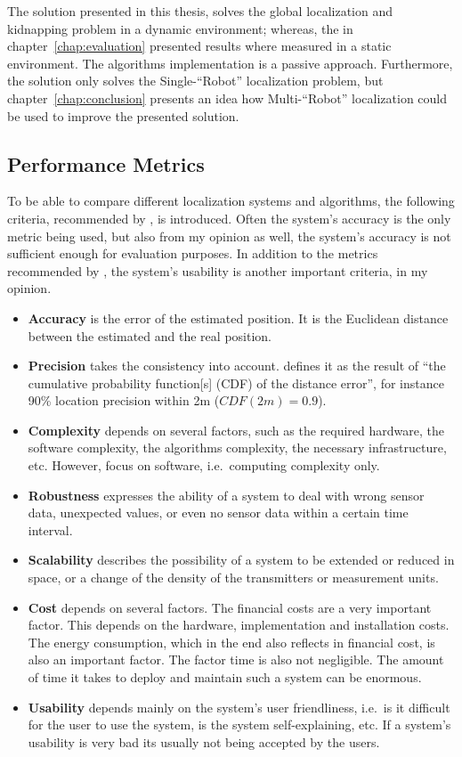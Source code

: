 \noindent The solution presented in this thesis, solves the global localization and kidnapping problem in a dynamic environment; whereas, the in chapter~\ref{chap:evaluation} presented results where measured in a static environment. The algorithms implementation is a passive approach. Furthermore, the solution only solves the Single-``Robot'' localization problem, but chapter~\ref{chap:conclusion} presents an idea how Multi-``Robot'' localization could be used to improve the presented solution.

\subsection{Performance Metrics}
To be able to compare different localization systems and algorithms, the following criteria, recommended by \citet{IEEE:survey_wireless_indoor_pos}, is introduced. Often the system's accuracy is the only metric being used, but also from my opinion as well, the system's accuracy is not sufficient enough for evaluation purposes. In addition to the metrics recommended by \citet{IEEE:survey_wireless_indoor_pos}, the system's usability is another important criteria, in my opinion.
\begin{itemize}
	\item \textbf{Accuracy} is the error of the estimated position. It is the Euclidean distance between the estimated and the real position.
	\item \textbf{Precision} takes the consistency into account. \citet{IEEE:survey_wireless_indoor_pos} defines it as the result of ``the cumulative probability function[s] (CDF) of the distance error'', for instance 90\% location precision within 2m ($CDF(2m) = 0.9$).
	\item \textbf{Complexity} depends on several factors, such as the required hardware, the software complexity, the algorithms complexity, the necessary infrastructure, etc. However, \citet{IEEE:survey_wireless_indoor_pos} focus on software, i.e.\ computing complexity only.
	\item \textbf{Robustness} expresses the ability of a system to deal with wrong sensor data, unexpected values, or even no sensor data within a certain time interval.
	\item \textbf{Scalability} describes the possibility of a system to be extended or reduced in space, or a change of the density of the transmitters or measurement units.
	\item \textbf{Cost} depends on several factors. The financial costs are a very important factor. This depends on the hardware, implementation and installation costs. The energy consumption, which in the end also reflects in financial cost, is also an important factor. The factor time is also not negligible. The amount of time it takes to deploy and maintain such a system can be enormous.
	\item \textbf{Usability} depends mainly on the system's user friendliness, i.e.\ is it difficult for the user to use the system, is the system self-explaining, etc. If a system's usability is very bad its usually not being accepted by the users.
\end{itemize}

